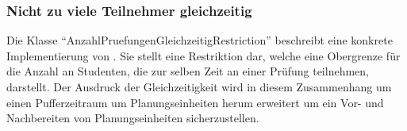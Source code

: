 \subsubsection{Nicht zu viele Teilnehmer gleichzeitig}\label{subsubsec:nicht-zu-viele-teilnehmer-gleichzeitig}
Die Klasse \enquote{AnzahlPruefungenGleichzeitigRestriction} beschreibt eine konkrete Implementierung von
\hyperref[subsubsec:anzahl-gleichzeitig-zu-hoch]{}.
Sie stellt eine Restriktion dar, welche eine Obergrenze für die Anzahl an Studenten,
die zur selben Zeit an einer Prüfung teilnehmen, darstellt.
Der Ausdruck der Gleichzeitigkeit wird in diesem Zusammenhang um einen Pufferzeitraum
um Planungseinheiten herum erweitert um ein Vor- und Nachbereiten von Planungseinheiten sicherzustellen.
